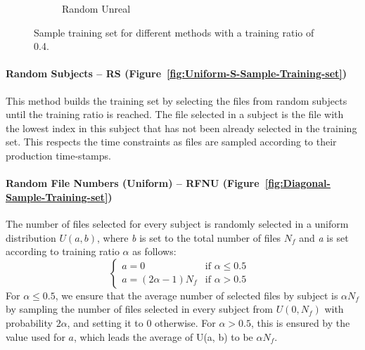 \documentclass[10pt, conference, compsocconf]{IEEEtran}
\begin{document}
\begin{figure}[h!]
\begin{subfigure}[b]{\columnwidth}
                  \caption{Random Unreal}
                  \label{fig:Random-Unreal-Sample-Training-set}
        \end{subfigure}
        \caption{Sample training set for different methods with a training ratio of 0.4.}
        \label{fig:sampling}
\end{figure}

\paragraph{Random Subjects -- RS 
(Figure~\ref{fig:Uniform-S-Sample-Training-set})} This method builds 
the training set by selecting the files from random subjects until the 
training ratio is reached. The file selected in a subject is the file 
with the lowest index in this subject that has not been already 
selected in the training set. This respects the time constraints as files are 
sampled according to their production time-stamps.

\paragraph{Random File Numbers (Uniform) -- RFNU (Figure~\ref{fig:Diagonal-Sample-Training-set})}
The number of files selected for every subject is randomly selected in
a uniform distribution $U(\textit{a},\textit{b})$, where \textit{b} is set to the total
number of files $N_{f}$ and \textit{a} is set according to training ratio $\alpha$ as follows:
\[
  \begin{cases}
          \textit{a} = 0      & \text{if $\alpha \leq 0.5$ }\\
          
          \textit{a} = (2\alpha - 1) N_{f} & \text{if $\alpha > 0.5$}
  \end{cases}
\]
 For $\alpha \leq 0.5$, we ensure that the average number of selected 
 files by subject is $\alpha N_f$ by sampling the number of 
 files selected in every subject from $U(0,N_f)$ with 
 probability $2\alpha$, and setting it to 0 otherwise. For $\alpha > 
 0.5$, this is ensured by the value used for $a$, which leads the 
 average of U(a, b) to be $\alpha N_f$.
\end{document}
